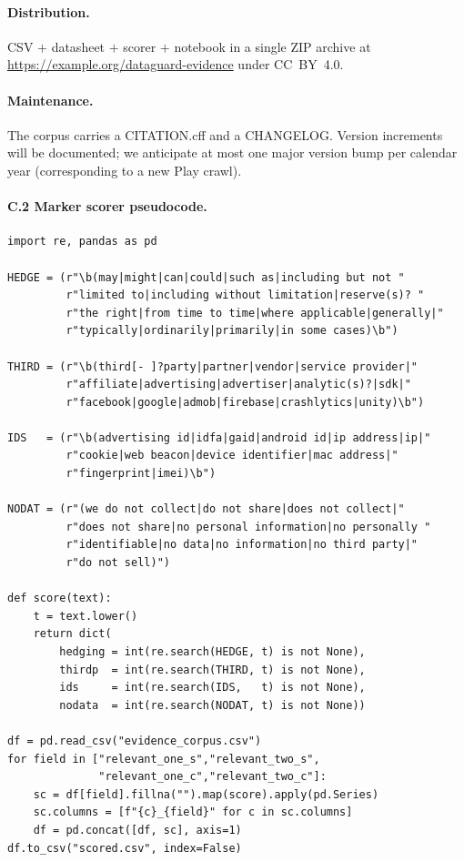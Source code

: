 \documentclass[11pt,a4paper]{article}
\begin{document}
\paragraph{Distribution.} CSV $+$ datasheet $+$ scorer $+$ notebook in
a single ZIP archive at \url{https://example.org/dataguard-evidence}
under CC~BY~4.0.

\paragraph{Maintenance.} The corpus carries a CITATION.cff and a
CHANGELOG. Version increments will be documented; we anticipate at
most one major version bump per calendar year (corresponding to a
new Play crawl).

\paragraph{C.2 Marker scorer pseudocode.}
\label{app:scorer}
{\small
\begin{verbatim}
import re, pandas as pd

HEDGE = (r"\b(may|might|can|could|such as|including but not "
         r"limited to|including without limitation|reserve(s)? "
         r"the right|from time to time|where applicable|generally|"
         r"typically|ordinarily|primarily|in some cases)\b")

THIRD = (r"\b(third[- ]?party|partner|vendor|service provider|"
         r"affiliate|advertising|advertiser|analytic(s)?|sdk|"
         r"facebook|google|admob|firebase|crashlytics|unity)\b")

IDS   = (r"\b(advertising id|idfa|gaid|android id|ip address|ip|"
         r"cookie|web beacon|device identifier|mac address|"
         r"fingerprint|imei)\b")

NODAT = (r"(we do not collect|do not share|does not collect|"
         r"does not share|no personal information|no personally "
         r"identifiable|no data|no information|no third party|"
         r"do not sell)")

def score(text):
    t = text.lower()
    return dict(
        hedging = int(re.search(HEDGE, t) is not None),
        thirdp  = int(re.search(THIRD, t) is not None),
        ids     = int(re.search(IDS,   t) is not None),
        nodata  = int(re.search(NODAT, t) is not None))

df = pd.read_csv("evidence_corpus.csv")
for field in ["relevant_one_s","relevant_two_s",
              "relevant_one_c","relevant_two_c"]:
    sc = df[field].fillna("").map(score).apply(pd.Series)
    sc.columns = [f"{c}_{field}" for c in sc.columns]
    df = pd.concat([df, sc], axis=1)
df.to_csv("scored.csv", index=False)
\end{verbatim}}
\end{document}
